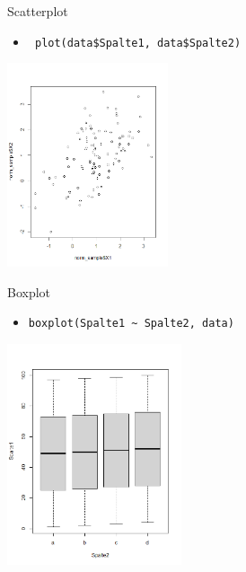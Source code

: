 \documentclass[xcolor=dvipsnames, aspectratio = 169]{beamer}
\begin{document}
\begin{frame}[fragile]{Scatterplot}
	\begin{itemize}
		\item \verb+ plot(data$Spalte1, data$Spalte2)+
	\end{itemize}
			
	\begin{center}
		\includegraphics[height=6cm]{Scatterplot}
	\end{center}
\end{frame}

\begin{frame}[fragile]{Boxplot}
	\begin{itemize}
		\item \verb+boxplot(Spalte1 ~ Spalte2, data)+
	\end{itemize}
			
	\begin{center}
		\includegraphics[height=6.5cm]{Boxplot}
	\end{center}
\end{frame}
\end{document}
